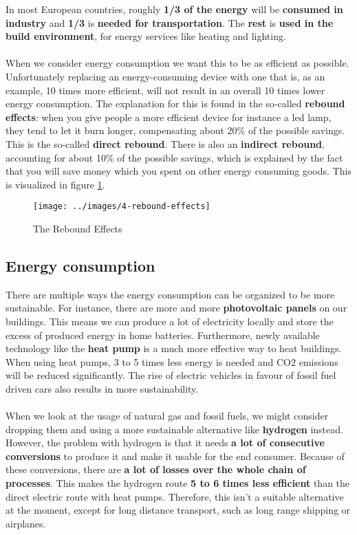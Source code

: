 \documentclass[../summary.tex]{subfiles}
\begin{document}
	In most European countries, roughly \textbf{1/3 of the energy} will be \textbf{consumed in industry} and \textbf{1/3} is \textbf{needed for transportation}. The \textbf{rest} is \textbf{used in the build environment}, for energy services like heating and lighting. 
	\\\\
	When we consider energy consumption we want this to be as efficient as possible. Unfortunately replacing an energy-consuming device with one that is, as an example, 10 times more efficient, will not result in an overall 10 times lower energy consumption. The explanation for this is found in the so-called \textbf{rebound effects}: when you give people a more efficient device for instance a led lamp, they tend to let it burn longer, compensating about 20\% of the possible savings. This is the so-called \textbf{direct rebound}. There is also an \textbf{indirect rebound}, accounting for about 10\% of the possible savings, which is explained by the fact that you will save money which you spent on other energy consuming goods.  This is visualized in figure \ref{fig:rebound-effects}.
	
	\begin{figure}[H]
	\centering
	\texttt{[image: ../images/4-rebound-effects]}
	\caption{The Rebound Effects}
	\label{fig:rebound-effects}
\end{figure}
	
	\subsection{Energy consumption}
	
	There are multiple ways the energy consumption can be organized to be more sustainable. For instance, there are more and more \textbf{photovoltaic panels} on our buildings. This means we can produce a lot of electricity locally and store the excess of produced energy in home batteries. Furthermore, newly available technology like the \textbf{heat pump} is a much more effective way to heat buildings. When using heat pumps, 3 to 5 times less energy is needed and CO2 emissions will be reduced significantly. The rise of electric vehicles in favour of fossil fuel driven cars also results in more sustainability.
	\\\\
	When we look at the usage of natural gas and fossil fuels, we might consider dropping them and using a more sustainable alternative like \textbf{hydrogen} instead. However, the problem with  hydrogen is that it needs \textbf{a lot of consecutive conversions} to produce it and make it usable for the end consumer. Because of these conversions, there are \textbf{a lot of losses over the whole chain of processes}. This makes the hydrogen route \textbf{5 to 6 times less efficient} than the direct electric route with heat pumps. Therefore, this isn't a suitable alternative at the moment, except for long distance transport, such as long range shipping or airplanes.
	
\end{document}
